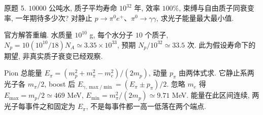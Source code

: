 \begin{exercise}\label{ex:8701-6-5}
原题 5. $10000$ 公吨水, 质子平均寿命 $10^{32}$ 年, 效率 $100\%$, 束缚与自由质子同衰变率, 一年期待多少次? 对静止 $p\to\pi^0e^+$、$\pi^0\to\gamma\gamma$, 求光子能量最大最小值.
\end{exercise}
\begin{solution}
官方解答重编. 水质量 $10^{10}$ g, 每个水分子 $10$ 个质子, $N_p=10(10^{10}/18)N_A\simeq3.35\times10^{33}$, 预期 $N_p/10^{32}\simeq33.5$ 次. 此为假设寿命下的期望, 非真实质子衰变已经观察.

Pion 总能量 $E_\pi=(m_p^2+m_\pi^2-m_e^2)/(2m_p)$, 动量 $p_\pi$ 由两体式求. 它静止系两光子各 $m_\pi/2$, boost 后 $E_{\gamma,\max/\min}=(E_\pi\pm p_\pi)/2$. 忽略 $m_e$ 得 $E_{\max}=m_p/2\simeq469$ MeV, $E_{\min}=m_\pi^2/(2m_p)\simeq9.71$ MeV. 能量在此区间连续, 两光子每事件之和固定为 $E_\pi$, 不是每事件都一高一低落在两个端点.
\end{solution}
